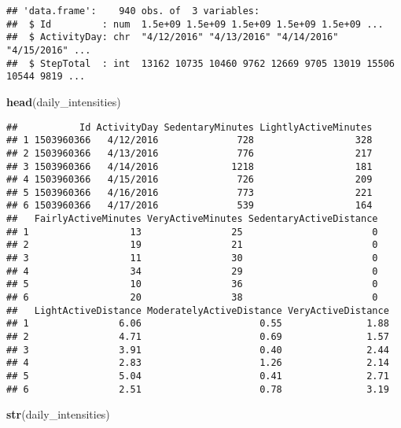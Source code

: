 \documentclass[
]{article}
\newenvironment{Shaded}{\begin{snugshade}}{\end{snugshade}}
\newcommand{\FunctionTok}[1]{\textcolor[rgb]{0.13,0.29,0.53}{\textbf{#1}}}
\newcommand{\NormalTok}[1]{#1}
\begin{document}
\begin{verbatim}
## 'data.frame':    940 obs. of  3 variables:
##  $ Id         : num  1.5e+09 1.5e+09 1.5e+09 1.5e+09 1.5e+09 ...
##  $ ActivityDay: chr  "4/12/2016" "4/13/2016" "4/14/2016" "4/15/2016" ...
##  $ StepTotal  : int  13162 10735 10460 9762 12669 9705 13019 15506 10544 9819 ...
\end{verbatim}

\begin{Shaded}
\begin{Highlighting}[]
\FunctionTok{head}\NormalTok{(daily\_intensities)}
\end{Highlighting}
\end{Shaded}

\begin{verbatim}
##           Id ActivityDay SedentaryMinutes LightlyActiveMinutes
## 1 1503960366   4/12/2016              728                  328
## 2 1503960366   4/13/2016              776                  217
## 3 1503960366   4/14/2016             1218                  181
## 4 1503960366   4/15/2016              726                  209
## 5 1503960366   4/16/2016              773                  221
## 6 1503960366   4/17/2016              539                  164
##   FairlyActiveMinutes VeryActiveMinutes SedentaryActiveDistance
## 1                  13                25                       0
## 2                  19                21                       0
## 3                  11                30                       0
## 4                  34                29                       0
## 5                  10                36                       0
## 6                  20                38                       0
##   LightActiveDistance ModeratelyActiveDistance VeryActiveDistance
## 1                6.06                     0.55               1.88
## 2                4.71                     0.69               1.57
## 3                3.91                     0.40               2.44
## 4                2.83                     1.26               2.14
## 5                5.04                     0.41               2.71
## 6                2.51                     0.78               3.19
\end{verbatim}

\begin{Shaded}
\begin{Highlighting}[]
\FunctionTok{str}\NormalTok{(daily\_intensities)}
\end{Highlighting}
\end{Shaded}
\end{document}

